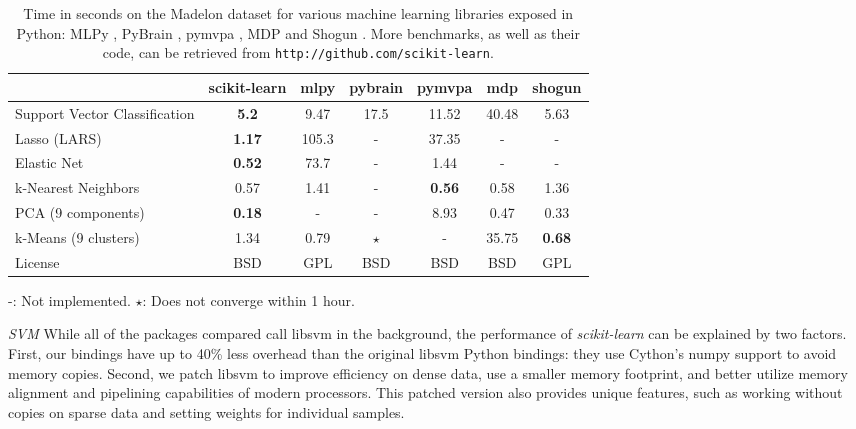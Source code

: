 \documentclass[twoside,11pt]{article}
\begin{document}
\begin{table}[t]
\small
\hspace*{.03\linewidth}%
\begin{tabular}{l c c c c c c}
\hline\hline %
 & scikit-learn & mlpy & pybrain & pymvpa &  mdp & shogun \\ [0.5ex]
\hline
Support Vector Classification & {\bf 5.2} & 9.47 & 17.5 & 11.52 & 40.48 & 5.63 \\
Lasso (LARS) & {\bf 1.17} & 105.3   & - &  37.35 & - & - \\
Elastic Net & {\bf 0.52} & 73.7 & -  &  1.44  & -  & - \\
k-Nearest Neighbors & 0.57 & 1.41 & - &  {\bf 0.56} & 0.58 & 1.36 \\
PCA (9 components) & {\bf 0.18} & - & - & 8.93  & 0.47 & 0.33 \\
k-Means (9 clusters) & 1.34 &  0.79 & $\star$ & -  & 35.75 & {\bf 0.68} \\
License &  BSD & GPL & BSD  &  BSD  & BSD  & GPL \\
\hline
\end{tabular}

-: Not implemented. \hfill
$\star$: Does not converge within 1 hour.

\vspace*{-1.5ex}
\caption{\small
Time in seconds on the Madelon dataset for various machine learning libraries exposed in Python:
MLPy \citep{albanese2008}, PyBrain \citep{schaul2010}, pymvpa
\citep{hanke2009}, MDP \citep{zito2008} and Shogun
\citep{sonnenburg2010}. 
More benchmarks, as well as their code, can be retrieved from {\tt http://github.com/scikit-learn}.
\vspace*{-1.5em}\label{tab:comparisons}
}
\end{table}

\emph{SVM}
%
While all of the packages compared call libsvm in the
background, the
performance of \emph{scikit-learn} can be explained by two factors.
First, our bindings have up to 40\% less overhead than the original
libsvm Python bindings: they use Cython's numpy support
to avoid memory copies. Second, we patch libsvm to improve efficiency
on dense data, use a smaller memory footprint, and better utilize memory
alignment and pipelining capabilities of modern processors. This patched
version also provides unique features, such as working without copies on
sparse data and setting weights for individual samples.
\end{document}
